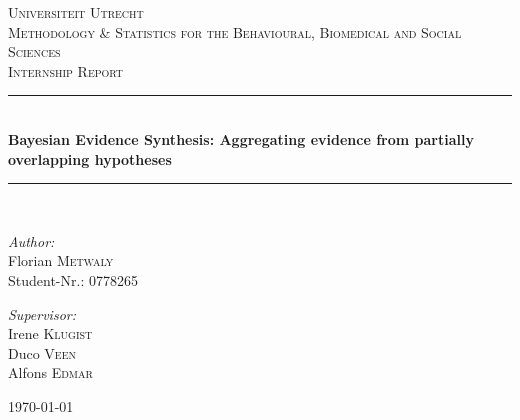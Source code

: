 \documentclass[12pt]{article}
\newcommand\HRule{\rule{\textwidth}{1pt}}
\begin{document}
\renewcommand{\refname}{Bibliography}

\begin{titlepage}

\begin{center}

\textsc{\LARGE Universiteit Utrecht}\\[2.5cm]

\textsc{\Large Methodology \& Statistics for the Behavioural, Biomedical and Social Sciences}\\[1cm]
\textsc{\large Internship Report}\\[1cm]
\HRule \\[0.4cm]
{ \LARGE \bfseries Bayesian Evidence Synthesis: Aggregating evidence from partially overlapping hypotheses}\\[0.4cm]

\HRule \\[4cm]
\begin{minipage}{0.45\textwidth}
\begin{flushleft} \large
\emph{Author:}\\
Florian \textsc{Metwaly} \\
Student-Nr.: 0778265
\end{flushleft}
\end{minipage}
\begin{minipage}{0.45\textwidth}
\begin{flushright} \large
\emph{Supervisor:} \\
Irene \textsc{Klugist} \\
Duco \textsc{Veen} \\
Alfons \textsc{Edmar}
\end{flushright}
\end{minipage}

\vfill

{\large \today} \\

\end{center}

\end{titlepage}

\tableofcontents
\newpage
\end{document}
